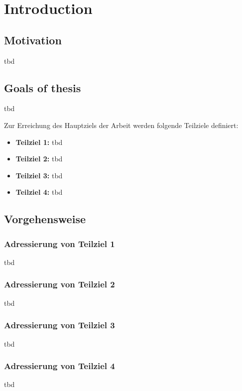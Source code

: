%
%
%
\chapter{Introduction}
\label{chap:intro}

%
%
%
\section{Motivation}
tbd

%
%
%
\section{Goals of thesis}
tbd

Zur Erreichung des Hauptziels der Arbeit werden folgende Teilziele definiert:

\begin{itemize}
   \item \textbf{Teilziel 1:} tbd  
   \item \textbf{Teilziel 2:} tbd  
   \item \textbf{Teilziel 3:} tbd  
   \item \textbf{Teilziel 4:} tbd  
\end{itemize}


%
%
%
\section{Vorgehensweise}
\subsection*{Adressierung von Teilziel 1}
tbd

\subsection*{Adressierung von Teilziel 2}
tbd

\subsection*{Adressierung von Teilziel 3}
tbd

\subsection*{Adressierung von Teilziel 4}
tbd